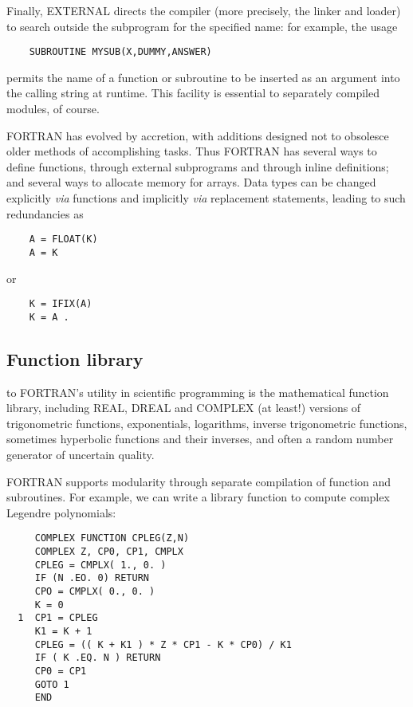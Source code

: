 Finally, EXTERNAL directs the compiler (more precisely, the linker and loader) to search outside the subprogram for the specified name: for example, the usage

\begin{verbatim}
    SUBROUTINE MYSUB(X,DUMMY,ANSWER)
\end{verbatim}

permits the name of a function or subroutine to be inserted as an argument into the calling string at runtime. This facility is essential to separately compiled modules, of course.

 FORTRAN has evolved by accretion, with additions designed not to obsolesce older methods of accomplishing tasks. Thus FORTRAN has several ways to define functions, through external subprograms and through inline definitions; and several ways to allocate memory for arrays. Data types can be changed explicitly \textit{via} functions and implicitly \textit{via} replacement statements, leading to such redundancies as

\begin{verbatim}
    A = FLOAT(K) 
    A = K
\end{verbatim}
or
\begin{verbatim}
    K = IFIX(A)
    K = A .
\end{verbatim}

\subsection{Function library}
 to FORTRAN's utility in scientific programming is the mathematical function library, including REAL, DREAL and COMPLEX (at least!) versions of trigonometric functions, exponentials, logarithms, inverse trigonometric functions, sometimes hyperbolic functions and their inverses, and often a random number generator of uncertain quality. 

FORTRAN supports modularity through separate compilation of function and subroutines. For example, we can write a library function to compute complex Legendre polynomials:

\begin{verbatim} 
     COMPLEX FUNCTION CPLEG(Z,N)
     COMPLEX Z, CP0, CP1, CMPLX
     CPLEG = CMPLX( 1., 0. ) 
     IF (N .EO. 0) RETURN
     CPO = CMPLX( 0., 0. )
     K = 0
  1  CP1 = CPLEG
     K1 = K + 1
     CPLEG = (( K + K1 ) * Z * CP1 - K * CP0) / K1
     IF ( K .EQ. N ) RETURN 
     CP0 = CP1
     GOTO 1 
     END
\end{verbatim}

